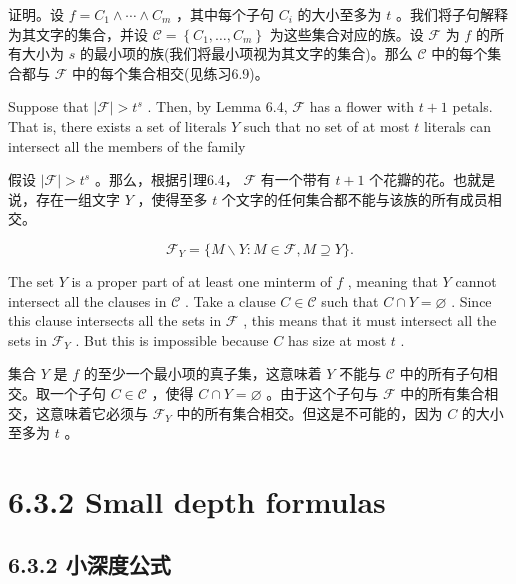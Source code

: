 \documentclass[10pt]{article}
\begin{document}
\begin{tcolorbox}\relax
证明。设 \(f = {C}_{1} \land  \cdots  \land  {C}_{m}\) ，其中每个子句 \({C}_{i}\) 的大小至多为 \(t\) 。我们将子句解释为其文字的集合，并设 \(\mathcal{C} = \left\{  {{C}_{1},\ldots ,{C}_{m}}\right\}\) 为这些集合对应的族。设 \(\mathcal{F}\) 为 \(f\) 的所有大小为 \(s\) 的最小项的族(我们将最小项视为其文字的集合)。那么 \(\mathcal{C}\) 中的每个集合都与 \(\mathcal{F}\) 中的每个集合相交(见练习6.9)。
\end{tcolorbox}

Suppose that \(\left| \mathcal{F}\right|  > {t}^{s}\) . Then, by Lemma 6.4, \(\mathcal{F}\) has a flower with \(t + 1\) petals. That is, there exists a set of literals \(Y\) such that no set of at most \(t\) literals can intersect all the members of the family

\begin{tcolorbox}\relax
假设 \(\left| \mathcal{F}\right|  > {t}^{s}\) 。那么，根据引理6.4， \(\mathcal{F}\) 有一个带有 \(t + 1\) 个花瓣的花。也就是说，存在一组文字 \(Y\) ，使得至多 \(t\) 个文字的任何集合都不能与该族的所有成员相交。
\end{tcolorbox}

\[
{\mathcal{F}}_{Y} = \{ M \smallsetminus  Y : M \in  \mathcal{F},M \supseteq  Y\} .
\]

The set \(Y\) is a proper part of at least one minterm of \(f\) , meaning that \(Y\) cannot intersect all the clauses in \(\mathcal{C}\) . Take a clause \(C \in  \mathcal{C}\) such that \(C \cap  Y = \varnothing\) . Since this clause intersects all the sets in \(\mathcal{F}\) , this means that it must intersect all the sets in \({\mathcal{F}}_{Y}\) . But this is impossible because \(C\) has size at most \(t\) .

\begin{tcolorbox}\relax
集合 \(Y\) 是 \(f\) 的至少一个最小项的真子集，这意味着 \(Y\) 不能与 \(\mathcal{C}\) 中的所有子句相交。取一个子句 \(C \in  \mathcal{C}\) ，使得 \(C \cap  Y = \varnothing\) 。由于这个子句与 \(\mathcal{F}\) 中的所有集合相交，这意味着它必须与 \({\mathcal{F}}_{Y}\) 中的所有集合相交。但这是不可能的，因为 \(C\) 的大小至多为 \(t\) 。
\end{tcolorbox}

\section*{6.3.2 Small depth formulas}

\begin{tcolorbox}\relax
\section*{6.3.2 小深度公式}
\end{tcolorbox}
\end{document}

